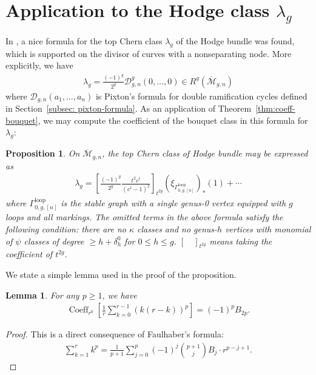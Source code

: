\documentclass[12pt,reqno]{amsart}
\DeclareMathOperator{\Coeff}{Coeff}
\newcommand{\Gammaloop}{\Gamma^\mathrm{loop}}
\theoremstyle{plain}
\newtheorem{lemma}[theorem]{Lemma}
\newtheorem{proposition}[theorem]{Proposition}
\theoremstyle{definition}
\theoremstyle{remark}
\begin{document}
\section{Application to the Hodge class $\lambda_g$}\label{sec:appl-lambda-g}

In \cite{janda2017double}, a nice formula
for the  top Chern class $\lambda_g$ of the Hodge bundle  was found, which is supported on the divisor of curves with a nonseparating node.
More explicitly, we have
\begin{align*}
\lambda_g=\frac{(-1)^g}{2^g} \mathcal{D}_{g,n}^{g}(0,\dots,0) \in R^{g}(\overline{\mathcal{M}}_{g,n})
\end{align*}
where $\mathcal{D}_{g,n}(a_1,\dots,a_n)$ is Pixton's formula for double ramification cycles defined in Section~\ref{subsec: pixton-formula}. 
As an application of Theorem~\ref{thm:coeff-bouquet}, we may compute the coefficient of the bouquet class in this formula for $\lambda_g$:
\begin{proposition}
  \label{prop:lambda_g}
    On $\overline{\mathcal{M}}_{g,n}$, the top Chern class of Hodge bundle may be expressed as
\begin{align*}
\lambda_g=\left[\frac{(-1)^g}{2^g}\frac{t^2e^t}{(e^t-1)^2}\right]_{t^{2g}}
\left(\xi_{\Gammaloop_{0,g,[n]}}\right)_*(1)+\cdots    
\end{align*}
where $\Gammaloop_{0,g,[n]}$ is the stable graph with a single genus-0 vertex equipped with $g$ loops and all markings.
The omitted terms in the above formula satisfy the following condition: there are no
$\kappa$ classes and no genus-$h$ vertices with monomial of $\psi$ classes of degree $\geq h+\delta_{h}^0$ for
$0\leq h\leq g$. $[\quad]_{t^{2g}}$ means taking the coefficient of $t^{2g}$.
\end{proposition}
We state a simple lemma used in the proof of the proposition.
\begin{lemma}\label{lem:kp}
  For any $p\geq1$, we have
  \begin{align*}
  \Coeff_{r^0}\left[\frac{1}{r}\sum_{k=0}^{r-1}  \left(k(r-k)\right)^p\right]
  =(-1)^{p}B_{2p}.
  \end{align*}
\end{lemma}
\begin{proof}
  This is a direct consequence of Faulhaber's formula:
  \begin{align*}
    \sum_{k=1}^{r}k^p
    =\frac{1}{p+1}\sum_{j=0}^{p}(-1)^{j}
    \binom{p+1}{j} B_{j} \cdot r^{p-j+1}.
  \end{align*}
\end{proof}
\end{document}
